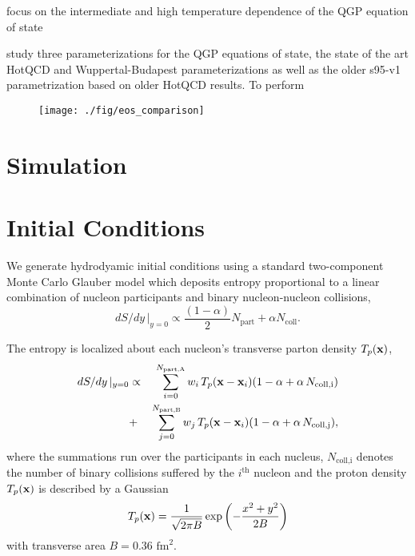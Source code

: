 \documentclass[aps,prc,reprint,amsmath,nofootinbib,superscriptaddress]{revtex4-1}
\begin{document}
focus on the intermediate and high temperature dependence of the QGP equation of state


study three parameterizations for the QGP equations of state, the state of the art HotQCD and Wuppertal-Budapest parameterizations \cite{?} as well as the older s95-v1 parametrization based on 
older HotQCD results. To perform

\begin{figure}[b!]
  \texttt{[image: ./fig/eos\_comparison]}
  \caption{
    \label{fig:spectra}
  }
\end{figure}

\section{Simulation}

\section{Initial Conditions}

We generate hydrodyamic initial conditions using a standard two-component Monte Carlo Glauber model which deposits entropy proportional to a linear combination of nucleon participants and binary nucleon-nucleon collisions,
\begin{equation}
 dS/dy \,\vert_{y=0} \propto \frac{(1-\alpha)}{2}N_\text{part} + \alpha N_\text{coll}.
\end{equation}

The entropy is localized about each nucleon's transverse parton density $T_p({\bf x})$,
\begin{eqnarray}
 dS/dy \,\vert_{y=0} &\propto& \sum\limits_{i=0}^{N_\text{part,A}} w_i\, T_p({\bf x} - {\bf x}_i)(1-\alpha + \alpha\, N_\text{coll,i}) \nonumber \\
                     &+& \sum\limits_{j=0}^{N_\text{part,B}} w_j\, T_p({\bf x} - {\bf x}_i)(1-\alpha + \alpha\, N_\text{coll,j}),
 \label{twocomponent}
\end{eqnarray}
where the summations run over the participants in each nucleus, $N_\text{coll,i}$ denotes the number of binary collisions suffered by the $i^\text{th}$ nucleon and the proton density $T_p({\bf x})$ is 
described by a Gaussian
\begin{equation}
 T_p({\bf x}) = \frac{1}{\sqrt{2 \pi B}} \exp \left(-\frac{x^2+y^2}{2 B} \right)
\end{equation}
with transverse area $B = 0.36$ $\text{fm}^2$.
\end{document}
